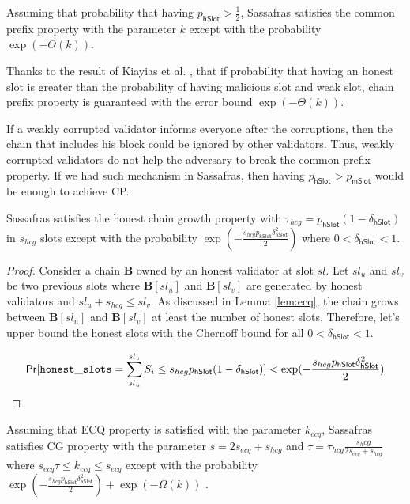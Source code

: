 \begin{lemma}[CP]\label{lem:cp}
	Assuming that probability that having  $ p_{\mathsf{hSlot}} >\frac{1}{2}$, Sassafras satisfies the common prefix property  with the parameter $ k $ except with the probability  $ \exp(-\Theta(k)) $. 
\end{lemma}

Thanks to the result of  Kiayias et al. \cite{consistency}, that if probability that having an honest slot is greater than the probability of having malicious slot and weak slot, chain prefix property is guaranteed with the error bound $ \exp(-\Theta(k)) $.

If a weakly corrupted validator informs everyone after the corruptions, then the chain that includes his block could be ignored by other validators. Thus, weakly corrupted validators do not help the adversary to break the common prefix property. If we had such mechanism in Sassafras, then having $ p_{\mathsf{hSlot}}  > p_{\mathsf{mSlot}} $ would be enough to achieve CP. 


\begin{lemma}[HCG]\label{lem:hcg}
	Sassafras satisfies the honest chain growth property with $ \tau_{hcg} = p_{\mathsf{hSlot}}(1-\delta_{\mathsf{hSlot}})  $ in $ s_{hcg} $ slots except with the probability $ \exp(-\frac{s_{hcg}p_{\mathsf{hSlot}}\delta_{\mathsf{hSlot}}^2}{2}) $ where $ 0< \delta_{\mathsf{hSlot}} < 1 $.
\end{lemma}

\begin{proof}
	Consider a chain $ \mathbf{B} $ owned by an honest validator at slot $ sl $. Let $ sl_u $ and $ sl_v $ be two previous slots where $ \mathbf{B}[sl_u] $ and $ \mathbf{B}[sl_v] $ are generated by honest validators and $ sl_u + s_{hcg} \leq sl_v $. As discussed in  Lemma \ref{lem:ecq}, the chain grows between $ \mathbf{B}[sl_u] $ and $ \mathbf{B}[sl_v] $ at least the number of honest slots. Therefore, let's upper bound the honest slots with the Chernoff bound for all $ 0<\delta_{\mathsf{hSlot}}<1 $.
	
	\begin{equation}
	\mathsf{Pr}[\mathtt{honest\_slots} = \sum_{sl_u}^{sl_v}S_i \leq s_{hcg} p_{\mathsf{hSlot}}(1-\delta_{\mathsf{hSlot}})] < \exp(-\frac{s_{hcg}p_{\mathsf{hSlot}}\delta_{\mathsf{hSlot}}^2}{2})
	\end{equation}
	
	
\end{proof}


\begin{lemma}[CG]\label{lem:cg}
	Assuming that ECQ property is satisfied with the parameter $ k_{ecq}  $, Sassafras satisfies CG property with the parameter $ s = 2s_{ecq} + s_{hcg} $ and $ \tau =  \tau_{hcg} \frac{s_hcg}{2 s_{ecq} + s_{hcg}}   $ where $ s_{ecq} \tau  \leq k_{ecq} \leq s_{ecq} $ except with the probability $ \exp(-\frac{s_{hcg}p_{\mathsf{hSlot}}\delta_{\mathsf{hSlot}}^2}{2}) +  \exp(-\Omega(k)) $ .
\end{lemma}

